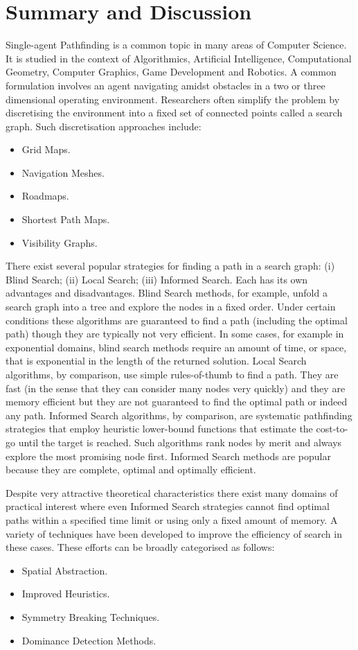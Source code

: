 \section{Summary and Discussion}
\label{cha::lit::discussion}
Single-agent Pathfinding is a common topic in many areas of Computer Science.
It is studied in the context of Algorithmics, Artificial Intelligence,
Computational Geometry, Computer Graphics, Game Development and Robotics.  A
common formulation involves an agent navigating amidst obstacles in a two or
three dimensional operating environment.  Researchers often simplify the
problem by discretising the environment into a fixed set of connected points
called a search graph. Such discretisation approaches include:
\begin{itemize}
\item Grid Maps.
\item Navigation Meshes.
\item Roadmaps.
\item Shortest Path Maps.
\item Visibility Graphs.
\end{itemize}

There exist several popular strategies for finding a path in a search graph:
(i) Blind Search; (ii) Local Search; (iii) Informed Search. Each has its own
advantages and disadvantages. Blind Search methods, for example, unfold a
search graph into a tree and explore the nodes in a fixed order. Under certain
conditions these algorithms are guaranteed to find a path (including the
optimal path) though they are typically not very efficient. In some cases,
for example in exponential domains,  blind search methods require an amount of 
time, or space, that is exponential in the length of the returned solution.  
Local Search algorithms,
by comparison, use simple rules-of-thumb to find a path.  They are fast (in
the sense that they can consider many nodes very quickly) and they are memory
efficient but they are not guaranteed to find the optimal path or indeed any
path.  Informed Search algorithms, by comparison, are systematic pathfinding
strategies that employ heuristic lower-bound functions that estimate the
cost-to-go until the target is reached. Such algorithms rank nodes by merit
and always explore the most promising node first. Informed Search methods are
popular because they are complete, optimal and optimally efficient.

Despite very attractive theoretical characteristics there exist many domains
of practical interest where even Informed Search strategies cannot find
optimal paths within a specified time limit or using only a fixed amount of
memory. A variety of techniques have been developed to improve the efficiency
of search in these cases. These efforts can be broadly categorised as follows:
\begin{itemize}
\item Spatial Abstraction.
\item Improved Heuristics.
\item Symmetry Breaking Techniques.
\item Dominance Detection Methods.
\end{itemize}

